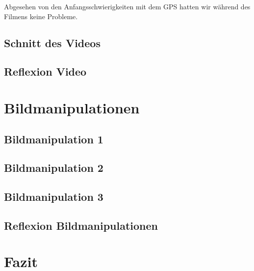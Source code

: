 \documentclass[11pt]{article}
\begin{document}
    Abgesehen von den Anfangsschwierigkeiten mit dem GPS hatten wir während des Filmens keine Probleme.

    \subsection{Schnitt des Videos}

    \subsection{Reflexion Video}

    \section{Bildmanipulationen}

    \subsection{Bildmanipulation 1}

    \subsection{Bildmanipulation 2}

    \subsection{Bildmanipulation 3}

    \subsection{Reflexion Bildmanipulationen}

    \section{Fazit}
\end{document}
